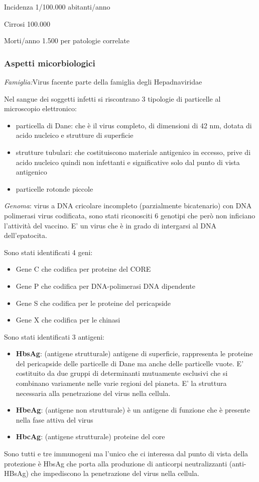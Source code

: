   Incidenza 1/100.000 abitanti/anno

  Cirrosi 100.000

  Morti/anno 1.500 per patologie correlate

\subsubsection{Aspetti micorbiologici}

  \emph{\emph{Famiglia:}}Virus facente parte della famiglia degli
  Hepadnaviridae

  Nel sangue dei soggetti infetti si riscontrano 3 tipologie di
  particelle al microscopio elettronico:

\begin{itemize}
\item
  particella di Dane: che è il virus completo, di dimensioni di 42 nm,
  dotata di acido nucleico e strutture di superficie
\item
  strutture tubulari: che costituiscono materiale antigenico in eccesso,
  prive di acido nucleico quindi non infettanti e significative solo dal
  punto di vista antigenico
\item
  particelle rotonde piccole
\end{itemize}
  \emph{\emph{Genoma}}: virus a DNA cricolare incompleto (parzialmente
  bicatenario) con DNA polimerasi virus codificata, sono stati
  riconosciti 6 genotipi che però non inficiano l'attività del vaccino.
  E' un virus che è in grado di intergarsi al DNA dell'epatocita.

  Sono stati identificati 4 geni:

\begin{itemize}
\item
  Gene C che codifica per proteine del CORE
\item
  Gene P che codifica per DNA-polimerasi DNA dipendente
\item
  Gene S che codifica per le proteine del pericapside
\item
  Gene X che codifica per le chinasi
\end{itemize}
  Sono stati identificati 3 antigeni:

\begin{itemize}
\item
  \textbf{HbsAg}: (antigene strutturale) antigene di superficie,
  rappresenta le proteine del pericapside delle particelle di Dane ma
  anche delle particelle vuote. E' costituito da due gruppi di
  determinanti mutuamente esclusivi che si combinano variamente nelle
  varie regioni del pianeta. E' la struttura necessaria alla
  penetrazione del virus nella cellula.
\item
  \textbf{HbeAg}: (antigene non strutturale) è un antigene di funzione
  che è presente nella fase attiva del virus
\item
  \textbf{HbcAg}: (antigene strutturale) proteine del core
\end{itemize}
  Sono tutti e tre immunogeni ma l'unico che ci interessa dal punto di
  vista della protezione è HbsAg che porta alla produzione di anticorpi
  neutralizzanti (anti-HBsAg) che impediscono la penetrazione del virus
  nella cellula.

